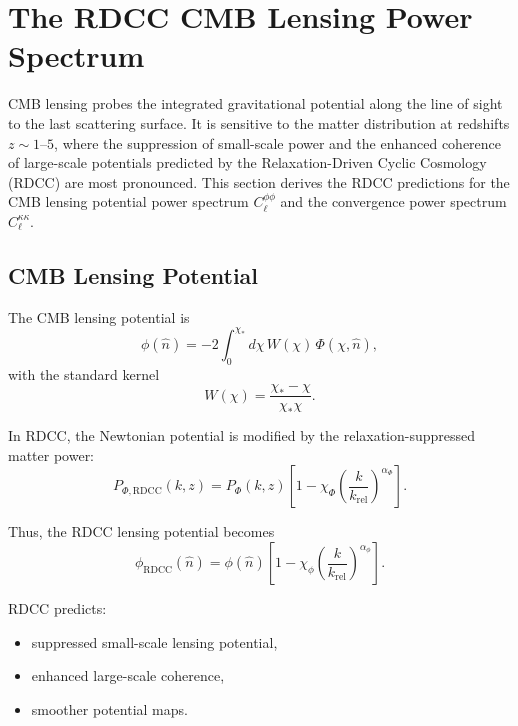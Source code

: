 \documentclass[11pt,a4paper]{article}
\begin{document}
\section{The RDCC CMB Lensing Power Spectrum}

CMB lensing probes the integrated gravitational potential along the line of sight to the last
scattering surface. It is sensitive to the matter distribution at redshifts $z \sim 1$–$5$, where the
suppression of small-scale power and the enhanced coherence of large-scale potentials predicted
by the Relaxation-Driven Cyclic Cosmology (RDCC) are most pronounced. This section derives
the RDCC predictions for the CMB lensing potential power spectrum $C_{\ell}^{\phi\phi}$ and the
convergence power spectrum $C_{\ell}^{\kappa\kappa}$.

\subsection{CMB Lensing Potential}

The CMB lensing potential is
\begin{equation}
\phi(\hat{n})
=
-2
\int_{0}^{\chi_{*}}
d\chi\,
W(\chi)\,
\Phi(\chi,\hat{n}),
\end{equation}
with the standard kernel
\begin{equation}
W(\chi)
=
\frac{\chi_{*}-\chi}{\chi_{*}\chi}.
\end{equation}

In RDCC, the Newtonian potential is modified by the relaxation-suppressed matter power:
\begin{equation}
P_{\Phi,\mathrm{RDCC}}(k,z)
=
P_{\Phi}(k,z)
\left[
1
-
\chi_{\Phi}
\left(
\frac{k}{k_{\mathrm{rel}}}
\right)^{\alpha_{\Phi}}
\right].
\end{equation}

Thus, the RDCC lensing potential becomes
\begin{equation}
\phi_{\mathrm{RDCC}}(\hat{n})
=
\phi(\hat{n})
\left[
1
-
\chi_{\phi}
\left(
\frac{k}{k_{\mathrm{rel}}}
\right)^{\alpha_{\phi}}
\right].
\end{equation}

RDCC predicts:
\begin{itemize}
\item suppressed small-scale lensing potential,
\item enhanced large-scale coherence,
\item smoother potential maps.
\end{itemize}
\end{document}
